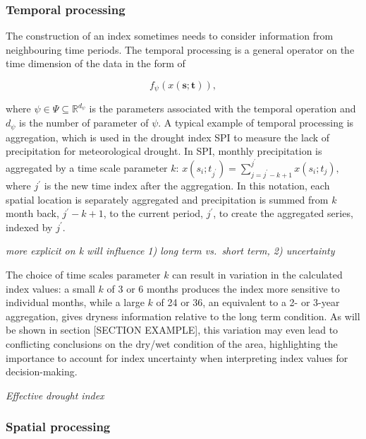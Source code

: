 \documentclass[
]{article}
\begin{document}
\hypertarget{temporal-processing}{%
\subsubsection{Temporal processing}\label{temporal-processing}}

The construction of an index sometimes needs to consider information
from neighbouring time periods. The temporal processing is a general
operator on the time dimension of the data in the form of

\begin{equation}
f_{\mathcal{\psi}}(x(\mathbf{s};\mathbf{t})),
\end{equation}

where \(\psi \in \Psi \subseteq \mathbb{R}^{d_{\psi}}\) is the
parameters associated with the temporal operation and \(d_{\psi}\) is
the number of parameter of \(\psi\). A typical example of temporal
processing is aggregation, which is used in the drought index SPI to
measure the lack of precipitation for meteorological drought. In SPI,
monthly precipitation is aggregated by a time scale parameter \(k\):
\(x(s_i;t_{j^\prime}) = \sum_{j = j^\prime-k+1}^{j^\prime}x(s_i; t_j),\)
where \(j^\prime\) is the new time index after the aggregation. In this
notation, each spatial location is separately aggregated and
precipitation is summed from \(k\) month back, \(j^\prime - k + 1\), to
the current period, \(j^\prime\), to create the aggregated series,
indexed by \(j^\prime\).

\emph{more explicit on k will influence 1) long term vs.~short term, 2)
uncertainty}

The choice of time scales parameter \(k\) can result in variation in the
calculated index values: a small \(k\) of 3 or 6 months produces the
index more sensitive to individual months, while a large \(k\) of 24 or
36, an equivalent to a 2- or 3-year aggregation, gives dryness
information relative to the long term condition. As will be shown in
section {[}SECTION EXAMPLE{]}, this variation may even lead to
conflicting conclusions on the dry/wet condition of the area,
highlighting the importance to account for index uncertainty when
interpreting index values for decision-making.

\emph{Effective drought index}

\hypertarget{spatial-processing}{%
\subsubsection{Spatial processing}\label{spatial-processing}}
\end{document}

